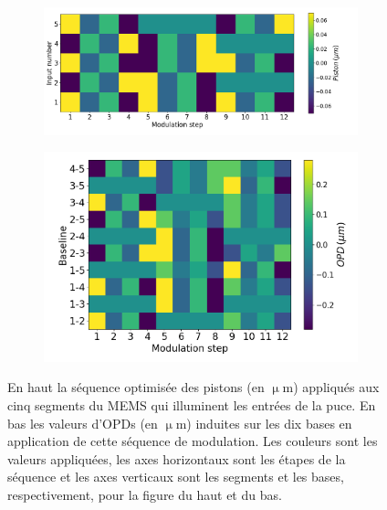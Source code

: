 \begin{figure}[ht!]
    \centering
    \begin{subfigure}{0.8\textwidth}
        \centering
        \includegraphics[width=\textwidth]{Figure_Chap3/20220826_MEMSModulationSequence_GoodSampling_step12.png}
    \end{subfigure}
    \begin{subfigure}{0.8\textwidth}
        \centering
        \includegraphics[width=\textwidth]{Figure_Chap3/20220826_MEMSModulationSequence_GoodSampling_step12_DiffBase.png}
    \end{subfigure}
    \caption[Séquence optimisée de modulation des MEMS à 12 pas pour échantillonner les franges sur FIRSTv2.]{En haut la séquence optimisée des pistons (en $\upmu$m) appliqués aux cinq segments du MEMS qui illuminent les entrées de la puce. En bas les valeurs d'OPDs (en $\upmu$m) induites sur les dix bases en application de cette séquence de modulation. Les couleurs sont les valeurs appliquées, les axes horizontaux sont les étapes de la séquence et les axes verticaux sont les segments et les bases, respectivement, pour la figure du haut et du bas.}
    \label{fig:ModSeq12}
\end{figure}


